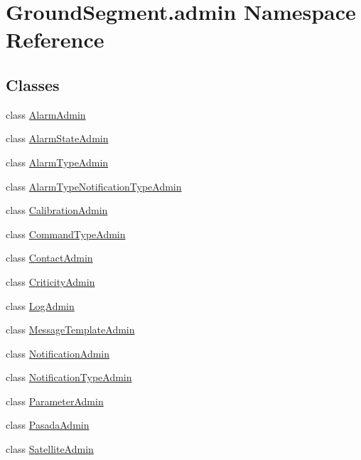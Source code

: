\hypertarget{namespace_ground_segment_1_1admin}{}\section{Ground\+Segment.\+admin Namespace Reference}
\label{namespace_ground_segment_1_1admin}
\subsection*{Classes}
\begin{DoxyCompactItemize}
\item 
class \hyperlink{class_ground_segment_1_1admin_1_1_alarm_admin}{Alarm\+Admin}
\item 
class \hyperlink{class_ground_segment_1_1admin_1_1_alarm_state_admin}{Alarm\+State\+Admin}
\item 
class \hyperlink{class_ground_segment_1_1admin_1_1_alarm_type_admin}{Alarm\+Type\+Admin}
\item 
class \hyperlink{class_ground_segment_1_1admin_1_1_alarm_type_notification_type_admin}{Alarm\+Type\+Notification\+Type\+Admin}
\item 
class \hyperlink{class_ground_segment_1_1admin_1_1_calibration_admin}{Calibration\+Admin}
\item 
class \hyperlink{class_ground_segment_1_1admin_1_1_command_type_admin}{Command\+Type\+Admin}
\item 
class \hyperlink{class_ground_segment_1_1admin_1_1_contact_admin}{Contact\+Admin}
\item 
class \hyperlink{class_ground_segment_1_1admin_1_1_criticity_admin}{Criticity\+Admin}
\item 
class \hyperlink{class_ground_segment_1_1admin_1_1_log_admin}{Log\+Admin}
\item 
class \hyperlink{class_ground_segment_1_1admin_1_1_message_template_admin}{Message\+Template\+Admin}
\item 
class \hyperlink{class_ground_segment_1_1admin_1_1_notification_admin}{Notification\+Admin}
\item 
class \hyperlink{class_ground_segment_1_1admin_1_1_notification_type_admin}{Notification\+Type\+Admin}
\item 
class \hyperlink{class_ground_segment_1_1admin_1_1_parameter_admin}{Parameter\+Admin}
\item 
class \hyperlink{class_ground_segment_1_1admin_1_1_pasada_admin}{Pasada\+Admin}
\item 
class \hyperlink{class_ground_segment_1_1admin_1_1_satellite_admin}{Satellite\+Admin}

\end{DoxyCompactItemize}
